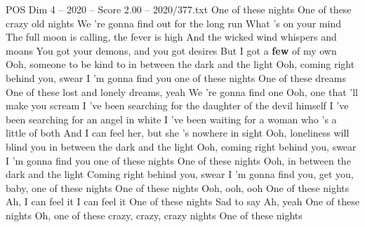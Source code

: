 \begin{textsample}{POS Dim 4 – 2020 – Score 2.00 – 2020/377.txt}  \label{ex:f4_pos_024}
One of these nights One of these crazy old nights We 're gonna find out for the long run What 's on your mind The full moon is calling, the fever is high And the wicked wind whispers and moans You got your demons, and you got desires But I got a \textbf{few} of my own Ooh, someone to be kind to in between the dark and the light Ooh, coming right behind you, swear I 'm gonna find you one of these nights One of these dreams One of these lost and lonely dreams, yeah We 're gonna find one Ooh, one that 'll make you scream I 've been searching for the daughter of the devil himself I 've been searching for an angel in white I 've been waiting for a woman who 's a little of both And I can feel her, but she 's nowhere in sight Ooh, loneliness will blind you in between the dark and the light Ooh, coming right behind you, swear I 'm gonna find you one of these nights One of these nights Ooh, in between the dark and the light Coming right behind you, swear I 'm gonna find you, get you, baby, one of these nights One of these nights Ooh, ooh, ooh One of these nights Ah, I can feel it I can feel it One of these nights Sad to say Ah, yeah One of these nights Oh, one of these crazy, crazy, crazy nights One of these nights

\end{textsample}
